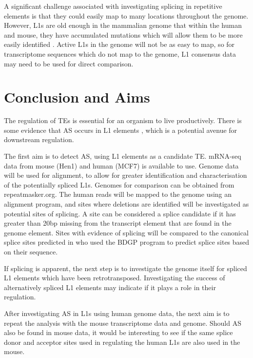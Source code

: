 \documentclass[12pt]{article}
\begin{document}
			A significant challenge associated with investigating splicing in repetitive elements is that they could easily map to many locations throughout the genome.
			However, L1s are old enough in the mammalian genome that within the human and mouse, they have accumulated mutations which will allow them to be more easily identified \citep{Brouha03,Goodier13}.
			Active L1s in the genome will not be as easy to map, so for transcriptome sequences which do not map to the genome, L1 consensus data may need to be used for direct comparison.
	
	\section{Conclusion and Aims}
	
		The regulation of TEs is essential for an organism to live productively.
		There is some evidence that AS occurs in L1 elements \citep{Belancio06}, which is a potential avenue for downstream regulation. 
		
		The first aim is to detect AS, using L1 elements as a candidate TE.
		mRNA-seq data from mouse (Hen1) and human (MCF7) is available to use.
		Genome data will be used for alignment, to allow for greater identification and characterisation of the potentially spliced L1s.
		Genomes for comparison can be obtained from repeatmasker.org.
		The human reads will be mapped to the genome using an alignment program, and sites where deletions are identified will be investigated as potential sites of splicing.
		A site can be considered a splice candidate if it has greater than 20bp missing from the transcript element that are found in the genome element.
		Sites with evidence of splicing will be compared to the canonical splice sites predicted in \citep{Belancio06} who used the BDGP program to predict splice sites based on their sequence. 
		
		If splicing is apparent, the next step is to investigate the genome itself for spliced L1 elements which have been retrotransposed.
		Investigating the success of alternatively spliced L1 elements may indicate if it plays a role in their regulation. 
		
		After investigating AS in L1s using human genome data, the next aim is to repeat the analysis with the mouse transcriptome data and genome.
		Should AS also be found in mouse data, it would be interesting to see if the same splice donor and acceptor sites used in regulating the human L1s are also used in the mouse. 
		
\end{document}
